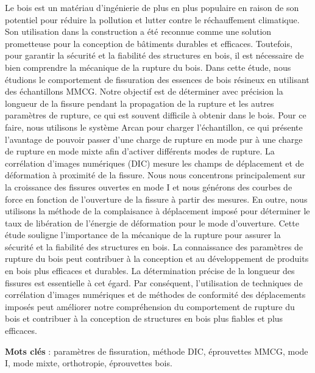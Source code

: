 \documentclass[
11pt, %
oneside, %
english, %
singlespacing, %
parskip, %
headsepline, %
chapterinoneline, %
]{MastersDoctoralThesis} %
\begin{document}
\begin{extraAbstract}

Le bois est un matériau d'ingénierie de plus en plus populaire en raison de son potentiel pour réduire la pollution et lutter contre le réchauffement climatique. Son utilisation dans la construction a été reconnue comme une solution prometteuse pour la conception de bâtiments durables et efficaces. Toutefois, pour garantir la sécurité et la fiabilité des structures en bois, il est nécessaire de bien comprendre la mécanique de la rupture du bois.
Dans cette étude, nous étudions le comportement de fissuration des essences de bois résineux en utilisant des échantillons MMCG. Notre objectif est de déterminer avec précision la longueur de la fissure pendant la propagation de la rupture et les autres paramètres de rupture, ce qui est souvent difficile à obtenir dans le bois. Pour ce faire, nous utilisons le système Arcan pour charger l'échantillon, ce qui présente l'avantage de pouvoir passer d'une charge de rupture en mode pur à une charge de rupture en mode mixte afin d'activer différents modes de rupture. La corrélation d'images numériques (DIC) mesure les champs de déplacement et de déformation à proximité de la fissure.
Nous nous concentrons principalement sur la croissance des fissures ouvertes en mode I et nous générons des courbes de force en fonction de l'ouverture de la fissure à partir des mesures. En outre, nous utilisons la méthode de la complaisance à déplacement imposé pour déterminer le taux de libération de l'énergie de déformation pour le mode d'ouverture.
Cette étude souligne l'importance de la mécanique de la rupture pour assurer la sécurité et la fiabilité des structures en bois. La connaissance des paramètres de rupture du bois peut contribuer à la conception et au développement de produits en bois plus efficaces et durables. La détermination précise de la longueur des fissures est essentielle à cet égard. Par conséquent, l'utilisation de techniques de corrélation d'images numériques et de méthodes de conformité des déplacements imposés peut améliorer notre compréhension du comportement de rupture du bois et contribuer à la conception de structures en bois plus fiables et plus efficaces.

\smallskip
\textbf{Mots clés} : paramètres de fissuration, méthode DIC, éprouvettes MMCG, mode I, mode mixte, orthotropie, éprouvettes bois.

\end{extraAbstract}
\end{document}
